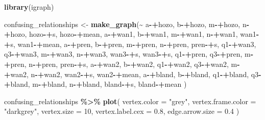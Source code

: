 \documentclass[
]{article}
\newenvironment{Shaded}{\begin{snugshade}}{\end{snugshade}}
\newcommand{\DataTypeTok}[1]{\textcolor[rgb]{0.13,0.29,0.53}{#1}}
\newcommand{\DecValTok}[1]{\textcolor[rgb]{0.00,0.00,0.81}{#1}}
\newcommand{\FloatTok}[1]{\textcolor[rgb]{0.00,0.00,0.81}{#1}}
\newcommand{\KeywordTok}[1]{\textcolor[rgb]{0.13,0.29,0.53}{\textbf{#1}}}
\newcommand{\NormalTok}[1]{#1}
\newcommand{\OperatorTok}[1]{\textcolor[rgb]{0.81,0.36,0.00}{\textbf{#1}}}
\newcommand{\StringTok}[1]{\textcolor[rgb]{0.31,0.60,0.02}{#1}}
\begin{document}
\begin{Shaded}
\begin{Highlighting}[]
\KeywordTok{library}\NormalTok{(igraph)}

\NormalTok{confusing\_relationships <{-}}\StringTok{ }\KeywordTok{make\_graph}\NormalTok{(}\OperatorTok{\textasciitilde{}}\StringTok{ }
\NormalTok{a}\OperatorTok{{-}+}\NormalTok{hozo, b}\OperatorTok{{-}+}\NormalTok{hozo, m}\OperatorTok{{-}+}\NormalTok{hozo, n}\OperatorTok{{-}+}\NormalTok{hozo, hozo}\OperatorTok{{-}+}\NormalTok{s, hozo}\OperatorTok{{-}+}\NormalTok{mean,}
\NormalTok{a}\OperatorTok{{-}+}\NormalTok{wan1, b}\OperatorTok{{-}+}\NormalTok{wan1, m}\OperatorTok{{-}+}\NormalTok{wan1, n}\OperatorTok{{-}+}\NormalTok{wan1, wan1}\OperatorTok{{-}+}\NormalTok{s, wan1}\OperatorTok{{-}+}\NormalTok{mean,}
\NormalTok{a}\OperatorTok{{-}+}\NormalTok{pren, b}\OperatorTok{{-}+}\NormalTok{pren, m}\OperatorTok{{-}+}\NormalTok{pren, n}\OperatorTok{{-}+}\NormalTok{pren, pren}\OperatorTok{{-}+}\NormalTok{s,}
\NormalTok{q1}\OperatorTok{{-}+}\NormalTok{wan3, q3}\OperatorTok{{-}+}\NormalTok{wan3, m}\OperatorTok{{-}+}\NormalTok{wan3, n}\OperatorTok{{-}+}\NormalTok{wan3, wan3}\OperatorTok{{-}+}\NormalTok{s, wan3}\OperatorTok{{-}+}\NormalTok{s,}
\NormalTok{q1}\OperatorTok{{-}+}\NormalTok{pren, q3}\OperatorTok{{-}+}\NormalTok{pren, m}\OperatorTok{{-}+}\NormalTok{pren, n}\OperatorTok{{-}+}\NormalTok{pren, pren}\OperatorTok{{-}+}\NormalTok{s,}
\NormalTok{a}\OperatorTok{{-}+}\NormalTok{wan2, b}\OperatorTok{{-}+}\NormalTok{wan2, q1}\OperatorTok{{-}+}\NormalTok{wan2, q3}\OperatorTok{{-}+}\NormalTok{wan2, m}\OperatorTok{{-}+}\NormalTok{wan2, n}\OperatorTok{{-}+}\NormalTok{wan2, wan2}\OperatorTok{{-}+}\NormalTok{s, wan2}\OperatorTok{{-}+}\NormalTok{mean,}
\NormalTok{a}\OperatorTok{{-}+}\NormalTok{bland, b}\OperatorTok{{-}+}\NormalTok{bland, q1}\OperatorTok{{-}+}\NormalTok{bland, q3}\OperatorTok{{-}+}\NormalTok{bland, m}\OperatorTok{{-}+}\NormalTok{bland, n}\OperatorTok{{-}+}\NormalTok{bland, bland}\OperatorTok{{-}+}\NormalTok{s, bland}\OperatorTok{{-}+}\NormalTok{mean}
\NormalTok{           ) }

\NormalTok{confusing\_relationships }\OperatorTok{\%>\%}\StringTok{ }\KeywordTok{plot}\NormalTok{(}
             \DataTypeTok{vertex.color =} \StringTok{"grey"}\NormalTok{,}
             \DataTypeTok{vertex.frame.color =} \StringTok{"darkgrey"}\NormalTok{,}
             \DataTypeTok{vertex.size =} \DecValTok{10}\NormalTok{,}
             \DataTypeTok{vertex.label.cex =} \FloatTok{0.8}\NormalTok{,}
             \DataTypeTok{edge.arrow.size =} \FloatTok{0.4}
\NormalTok{             )}
\end{Highlighting}
\end{Shaded}
\end{document}
